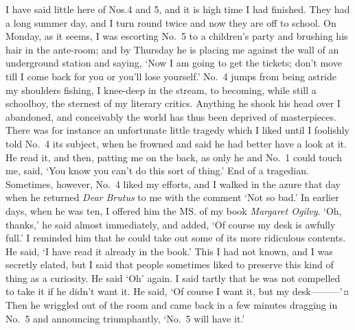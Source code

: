 I have said little here of Nos.\@ 4 and 5, and it is high time I had finished.
They had a long summer day, and I turn round twice and now they are off to school.
On Monday, as it seems,
I was escorting No.~5 to a children’s party and brushing his hair in the ante-room;
and by Thursday he is placing me against the wall of an underground station and saying,
‘Now I am going to get the tickets;
don’t move till I come back for you or you’ll lose yourself.’
No.~4 jumps from being astride my shoulders fishing, I knee-deep in the stream,
to becoming, while still a schoolboy, the sternest of my literary critics.
Anything he shook his head over I abandoned,
and conceivably the world has thus been deprived of masterpieces.
There was for instance an unfortunate little tragedy which I liked
until I foolishly told No.~4 its subject,
when he frowned and said he had better have a look at it.
He read it, and then, patting me on the back, as only he and No.~1 could touch me, said,
‘You know you can’t do this sort of thing.’
End of a tragedian.
Sometimes, however, No.~4 liked my efforts,
and I walked in the azure that day when he returned \emph{Dear Brutus} to me
with the comment ‘Not so bad.’
In earlier days, when he was ten, I offered him the MS. of my book \emph{Margaret Ogilvy}.
‘Oh, thanks,’ he said almost immediately, and added, ‘Of course my desk is awfully full.’
I reminded him that he could take out some of its more ridiculous contents.
He said, ‘I have read it already in the book.’
This I had not known, and I was secretly elated,
but I said that people sometimes liked to preserve this kind of thing as a curiosity.
He said ‘Oh’ again.
I said tartly that he was not compelled to take it if he didn’t want it.
He said, ‘Of course I want it, but my desk———’¤
Then he wriggled out of the room and came back in a few minutes
dragging in No.~5 and announcing triumphantly, ‘No.~5 will have it.’

